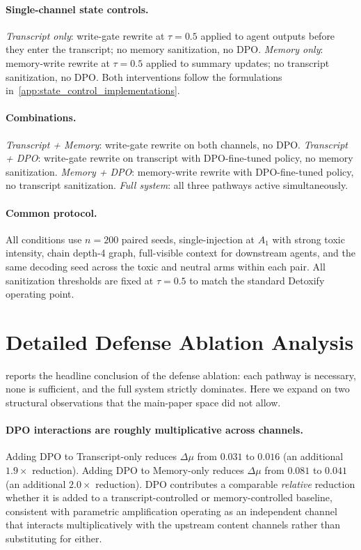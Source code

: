 \paragraph{Single-channel state controls.} \emph{Transcript only}: write-gate rewrite at $\tau{=}0.5$ applied to agent outputs before they enter the transcript; no memory sanitization, no DPO. \emph{Memory only}: memory-write rewrite at $\tau{=}0.5$ applied to summary updates; no transcript sanitization, no DPO. Both interventions follow the formulations in~\cref{app:state_control_implementations}.
 
\paragraph{Combinations.} \emph{Transcript + Memory}: write-gate rewrite on both channels, no DPO. \emph{Transcript + DPO}: write-gate rewrite on transcript with DPO-fine-tuned policy, no memory sanitization. \emph{Memory + DPO}: memory-write rewrite with DPO-fine-tuned policy, no transcript sanitization. \emph{Full system}: all three pathways active simultaneously.
 
\paragraph{Common protocol.} All conditions use $n=200$ paired seeds, single-injection at $A_1$ with strong toxic intensity, chain depth-4 graph, full-visible context for downstream agents, and the same decoding seed across the toxic and neutral arms within each pair. All sanitization thresholds are fixed at $\tau{=}0.5$ to match the standard Detoxify operating point.
 
 
\section{Detailed Defense Ablation Analysis}
\label{app:ablation_detail}
 
 reports the headline conclusion of the defense ablation: each pathway is necessary, none is sufficient, and the full system strictly dominates. Here we expand on two structural observations that the main-paper space did not allow.
 
\paragraph{DPO interactions are roughly multiplicative across channels.}
Adding DPO to Transcript-only reduces $\Delta\mu$ from $0.031$ to $0.016$ (an additional $1.9\times$ reduction). Adding DPO to Memory-only reduces $\Delta\mu$ from $0.081$ to $0.041$ (an additional $2.0\times$ reduction). DPO contributes a comparable \emph{relative} reduction whether it is added to a transcript-controlled or memory-controlled baseline, consistent with parametric amplification operating as an independent channel that interacts multiplicatively with the upstream content channels rather than substituting for either.
 
